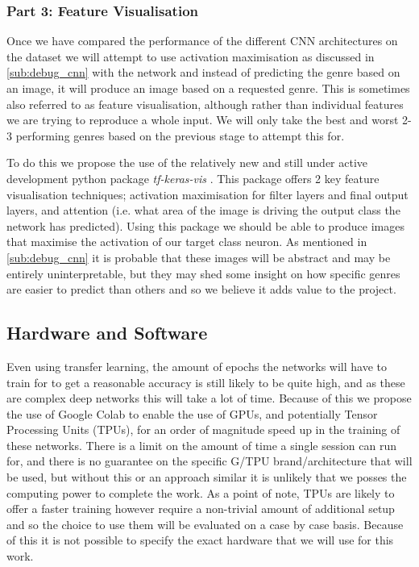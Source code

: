 \documentclass[12pt]{article}
\numberwithin{equation}{section}
\numberwithin{figure}{section}
\begin{document}
\subsubsection{Part 3: Feature Visualisation}
\label{sub:part_3_inverting_the_network}
Once we have compared the performance of the different CNN architectures on the dataset we will attempt to use activation maximisation as discussed in \cref{sub:debug_cnn} with the network and instead of predicting the genre based on an image, it will produce an image based on a requested genre. This is sometimes also referred to as feature visualisation, although rather than individual features we are trying to reproduce a whole input. We will only take the best and worst 2-3 performing genres based on the previous stage to attempt this for.

To do this we propose the use of the relatively new and still under active development python package \emph{tf-keras-vis} \cite{keras-vis}. This package offers 2 key feature visualisation techniques; activation maximisation for filter layers and final output layers, and attention (i.e. what area of the image is driving the output class the network has predicted). Using this package we should be able to produce images that maximise the activation of our target class neuron. As mentioned in \cref{sub:debug_cnn} it is probable that these images will be abstract and may be entirely uninterpretable, but they may shed some insight on how specific genres are easier to predict than others and so we believe it adds value to the project.

\subsection{Hardware and Software}
Even using transfer learning, the amount of epochs the networks will have to train for to get a reasonable accuracy is still likely to be quite high, and as these are complex deep networks this will take a lot of time. Because of this we propose the use of Google Colab \cite{Google} to enable the use of GPUs, and potentially Tensor Processing Units (TPUs), for an order of magnitude speed up in the training of these networks. There is a limit on the amount of time a single session can run for, and there is no guarantee on the specific G/TPU brand/architecture that will be used, but without this or an approach similar it is unlikely that we posses the computing power to complete the work. As a point of note, TPUs are likely to offer a faster training however require a non-trivial amount of additional setup and so the choice to use them will be evaluated on a case by case basis. Because of this it is not possible to specify the exact hardware that we will use for this work.
\end{document}
